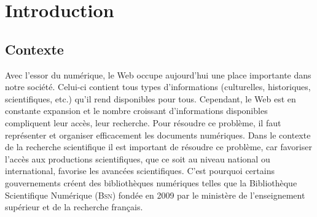 \chapter{Introduction}
\label{chap:main-introduction}


  \section{Contexte}
  \label{sec:main-introduction-context}
    Avec l'essor du numérique, le Web occupe aujourd'hui une place importante
    dans notre société. Celui-ci contient tous types d'informations
    (culturelles, historiques, scientifiques, etc.) qu'il rend disponibles
    pour tous. Cependant, le Web est en constante expansion et le nombre
    croissant d'informations disponibles compliquent leur accès, leur
    recherche. Pour résoudre ce problème, il faut représenter et organiser
    efficacement les documents numériques. Dans le contexte de la recherche
    scientifique il est important de résoudre ce problème, car favoriser
    l'accès aux productions scientifiques, que ce soit au niveau national ou
    international, favorise les avancées scientifiques. C'est pourquoi
    certains gouvernements créent des bibliothèques numériques telles que la
    Bibliothèque Scientifique Numérique (\textsc{Bsn}) fondée en 2009 par le
    ministère de l'enseignement supérieur et de la recherche français.


